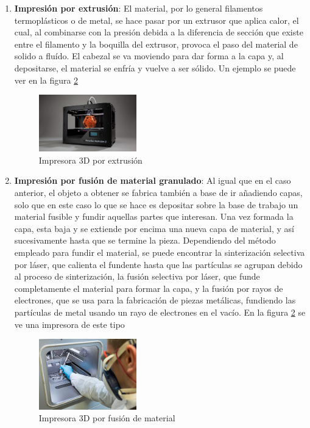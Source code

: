 \begin{enumerate}
\item \textbf{Impresión por extrusión}: El material, por lo general filamentos termoplásticos o de metal, se hace pasar por un extrusor que aplica calor, el cual, al combinarse con la presión debida a la diferencia de sección que existe entre el filamento y la boquilla del extrusor, provoca el paso del material de solido a fluído. El cabezal se va moviendo para dar forma a la capa y, al depositarse, el material se enfría y vuelve a ser sólido. Un ejemplo se puede ver en la figura \ref{fig:impresora_extrusion}\\

\begin{figure}[H]
        \centering
        \includegraphics[width=0.4\textwidth]{images/impresion_por_extrusion.jpg}
        \caption{Impresora 3D por extrusión}
        \label{fig:impresora_extrusion}
\end{figure} 

\item \textbf{Impresión por fusión de material granulado}: Al igual que en el caso anterior, el objeto a obtener se fabrica también a base de ir añadiendo capas, solo que en este caso lo que se hace es depositar sobre la base de trabajo un material fusible y fundir aquellas partes que interesan. Una vez formada la capa, esta baja y se extiende por encima una nueva capa de material, y así sucesivamente hasta que se termine la pieza. Dependiendo del método empleado para fundir el material, se puede encontrar la sinterización selectiva por láser, que calienta el fundente hasta que las partículas se agrupan debido al proceso de sinterización, la fusión selectiva por láser, que funde completamente el material para formar la capa, y la fusión por rayos de electrones, que se usa para la fabricación de piezas metálicas, fundiendo las partículas de metal usando un rayo de electrones en el vacío. En la figura \ref{fig:impresora_extrusion} se ve una impresora de este tipo\\

\begin{figure}[H]
        \centering
        \includegraphics[width=0.4\textwidth]{images/impresion_fusion.jpg}
        \caption{Impresora 3D por fusión de material}
        \label{fig:impresora_extrusion}
\end{figure} 


\end{enumerate}
